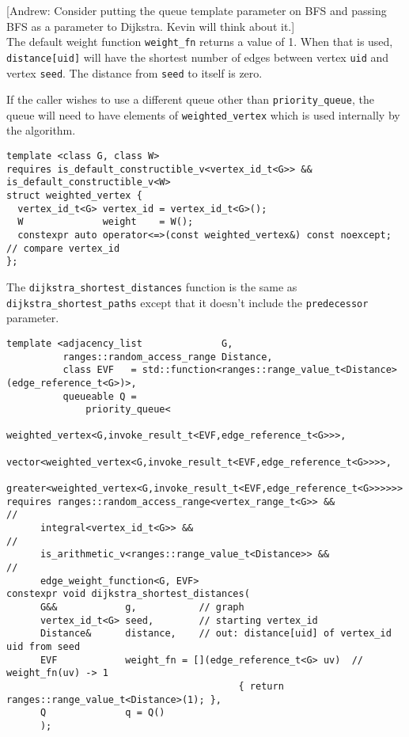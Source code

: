 \documentclass[10pt,onecolumn]{article}
\newcommand{\tcode}[1]{\lstinline[breaklines=true]{#1}}
\newcommand{\comment}[2]{{\color{comment}[{\sc #1:} \textsf{#2}]}}
\newcommand{\andrew}[1]{\comment{Andrew}{#1}}
\begin{document}
\andrew{Consider putting the queue template parameter on BFS and passing BFS as a parameter to Dijkstra. Kevin will think about it.} \\

The default weight function \tcode{weight_fn} returns a value of 1. When that is used, \tcode{distance[uid]} will have the shortest number of edges 
between vertex \tcode{uid} and vertex \tcode{seed}. The distance from \tcode{seed} to itself is zero.

If the caller wishes to use a different queue other than \tcode{priority_queue}, the queue will need to have elements of \tcode{weighted_vertex}
which is used internally by the algorithm.
\begin{lstlisting}
template <class G, class W>
requires is_default_constructible_v<vertex_id_t<G>> && is_default_constructible_v<W>
struct weighted_vertex {
  vertex_id_t<G> vertex_id = vertex_id_t<G>();
  W              weight    = W();
  constexpr auto operator<=>(const weighted_vertex&) const noexcept; // compare vertex_id
};
\end{lstlisting}

The \tcode{dijkstra_shortest_distances} function is the same as \tcode{dijkstra_shortest_paths} except that it doesn't include
the \tcode{predecessor} parameter.
\begin{lstlisting}
template <adjacency_list              G,
          ranges::random_access_range Distance,
          class EVF   = std::function<ranges::range_value_t<Distance>(edge_reference_t<G>)>,
          queueable Q = 
              priority_queue<
                  weighted_vertex<G,invoke_result_t<EVF,edge_reference_t<G>>>,
                  vector<weighted_vertex<G,invoke_result_t<EVF,edge_reference_t<G>>>>,
                  greater<weighted_vertex<G,invoke_result_t<EVF,edge_reference_t<G>>>>>>
requires ranges::random_access_range<vertex_range_t<G>> &&                  //
      integral<vertex_id_t<G>> &&                                           //
      is_arithmetic_v<ranges::range_value_t<Distance>> &&                   //
      edge_weight_function<G, EVF>
constexpr void dijkstra_shortest_distances(
      G&&            g,           // graph
      vertex_id_t<G> seed,        // starting vertex_id
      Distance&      distance,    // out: distance[uid] of vertex_id uid from seed
      EVF            weight_fn = [](edge_reference_t<G> uv)  // weight_fn(uv) -> 1
                                         { return ranges::range_value_t<Distance>(1); },
      Q              q = Q()
      );
\end{lstlisting}
\end{document}
